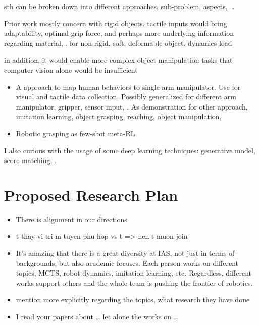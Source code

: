 sth can be broken down into different approaches, sub-problem, aspects, \dots

Prior work mostly concern with rigid objects.
tactile inputs would bring adaptability, optimal grip force, and perhaps more underlying information regarding material, \etc. for non-rigid, soft, deformable object. dynamics load

in addition, it would enable more complex object manipulation tasks that computer vision alone would be insufficient

\begin{itemize}
	\item A approach to map human behaviors to single-arm manipulator. Use for visual and tactile data collection. Possibly generalized for different arm manipulator, gripper, sensor input, \etc. As demonstration for other approach, imitation learning, object grasping, reaching, object manipulation, \etc
	\item Robotic grasping as few-shot meta-\ac{RL}
\end{itemize}

I also curious with the usage of some deep learning techniques: generative model, score matching, \etc.

\section{Proposed Research Plan}

\todo{}

\begin{itemize}
	\item There is alignment in our directions
	\item t thay vi tri m tuyen phu hop vs t => nen t muon join
	\item It’s amazing that there is a great diversity at IAS, not just in terms of backgrounds, but also academic focuses. Each person works on different topics, MCTS, robot dynamics, imitation learning, etc. Regardless, different works support others and the whole team is pushing the frontier of robotics.
\end{itemize}

\begin{itemize}
	\item mention more explicitly regarding the topics, what research they have done
	\item I read your papers about … let alone the works on …
\end{itemize}
